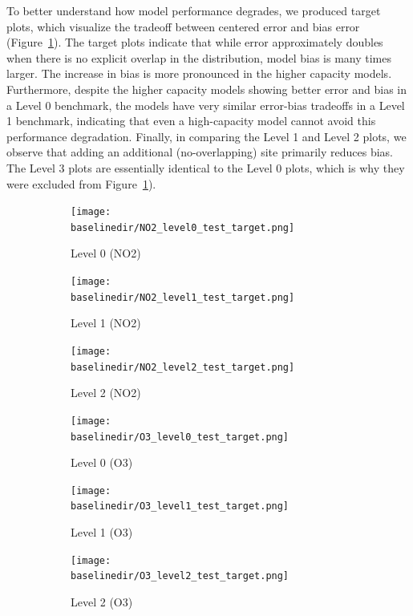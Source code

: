 \documentclass[journal abbreviation, manuscript]{copernicus}
\begin{document}
To better understand how model performance degrades, we produced target plots, which visualize the tradeoff between centered error and bias  error (Figure~\ref{fig:target-plots-levels}).  The target plots indicate that while error approximately doubles when there is no explicit overlap in the distribution, model bias is many times larger. The increase in bias is more pronounced in the higher capacity models. Furthermore, despite the higher capacity models showing better error and bias in a Level 0 benchmark, the models have very similar error-bias tradeoffs in a Level 1 benchmark, indicating that even a high-capacity model cannot avoid this performance degradation.  Finally, in comparing the Level 1 and Level 2 plots, we observe that adding an additional (no-overlapping) site primarily reduces bias.  The Level 3 plots are essentially identical to the Level 0 plots, which is why they were excluded from Figure~\ref{fig:target-plots-levels}).


\begin{figure}[H]
\centering
\begin{subfigure}{0.33\textwidth}
\texttt{[image: \\baselinedir/NO2\_level0\_test\_target.png]}
\caption{Level 0 (NO2)}
\end{subfigure}
\begin{subfigure}{0.33\textwidth}
\texttt{[image: \\baselinedir/NO2\_level1\_test\_target.png]}
\caption{Level 1 (NO2)}
\end{subfigure}
\begin{subfigure}{0.33\textwidth}
\texttt{[image: \\baselinedir/NO2\_level2\_test\_target.png]}
\caption{Level 2 (NO2)}
\end{subfigure}
\begin{subfigure}{0.33\textwidth}
\texttt{[image: \\baselinedir/O3\_level0\_test\_target.png]}
\caption{Level 0 (O3)}
\end{subfigure}
\begin{subfigure}{0.33\textwidth}
\texttt{[image: \\baselinedir/O3\_level1\_test\_target.png]}
\caption{Level 1 (O3)}
\end{subfigure}
\begin{subfigure}{0.33\textwidth}
\texttt{[image: \\baselinedir/O3\_level2\_test\_target.png]}
\caption{Level 2 (O3)}
\end{subfigure}
\caption{}
\label{fig:target-plots-levels}
\end{figure}
\end{document}
